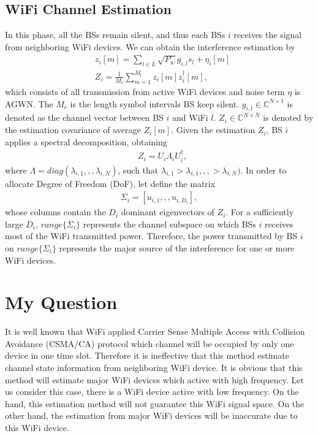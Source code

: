 \documentclass[12pt, onecolumn]{IEEEtran}
\begin{document}
\subsection{WiFi Channel Estimation}
In this phase, all the BSs remain silent, and thus each BSs $i$  receives the signal from neighboring  WiFi devices. We can obtain the interference  estimation by
\begin{equation}
    \begin{aligned}
        & z_{i}[m] = \sum_{l\in{}L} \sqrt{P_{w}}g_{i,l}s_{l} + \eta_{i}[m] \\
        & Z_{i} = \frac{1}{M_{c}}\sum_{m=1}^{M_{c}} z_{i}[m]z_{i}^{\dag}[m],
    \end{aligned}
\end{equation}
which consists of all transmission from active WiFi devices and noise term $\eta$ is AGWN. The $M_{c}$ is the length symbol intervals BS keep silent. $g_{i,l}\in{}\mathbb{C}^{N\times{}1}$ is denoted as the channel vector between  BS $i$ and WiFi $l$. $ Z_{i}\in\mathbb{C}^{N\times{}N}$ is denoted by the estimation covariance of average $Z_{i}[m]$. Given the estimation $Z_{i}$, BS $i$ applies a spectral decomposition, obtaining
\begin{equation}
    \begin{aligned}
        & Z_{i} = U_{i}\Lambda_{i}U^{\dag}_{i},
    \end{aligned}
\end{equation}
where $\Lambda = diag(\lambda_{i,1},,,\lambda_{i,N})$, such that $\lambda_{i,1}>\lambda_{i,1},,,>\lambda_{i,N})$.  In order to  allocate Degree of Freedom (DoF), let define the matrix
\begin{equation}
    \begin{aligned}
        \Sigma_{i} = [u_{i,1},,,u_{i,D_{i}}],
    \end{aligned}
\end{equation}
whose columns contain the $D_{i}$ dominant eigenvectors of $Z_{i}$. For a sufficiently large $D_{i}$, $range\{\Sigma_{i}\}$ represents the channel subspace on which BSs $i$ receives most of the WiFi transmitted power. Therefore, the power transmitted by BS $i$  on $range\{\Sigma_{i}\}$ represents the major source of the interference for one or more WiFi devices.

\section{My Question}
It is well known that WiFi applied Carrier Sense Multiple Access with Collision Avoidance (CSMA/CA) protocol which channel will be occupied by only one  device in one time slot.  Therefore it is ineffective that this method  estimate channel state information from neighboring WiFi device. It is obvious that this method will estimate  major WiFi devices which active with high frequency. Let us consider this case, there is a WiFi  device  active with low frequency. On the hand, this estimation method will not guarantee this WiFi signal space. On the other hand, the estimation from major WiFi devices will be inaccurate due to this  WiFi device.  
\end{document}
